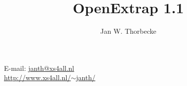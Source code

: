 \documentclass[11pt]{article}
\makeatletter
\newcommand{\email}{{\sf janth@xs4all.nl}}
\newcommand{\wwwhref}{\href{http://www.xs4all.nl/~janth/}{http://www.xs4all.nl/$\sim$janth/}}
\makeatother
\begin{document}
\newdimen{\mybaselineskip}
\mybaselineskip=24pt
\title{OpenExtrap 1.1}

\author{Jan W. Thorbecke}


\maketitle
\begin{center}
E-mail: \href{mailto:janth@xs4all.nl}{\email{}} \\
\wwwhref \\
\end{center}
\newpage
\setcounter{tocdepth}{2}
\tableofcontents







\end{document}
